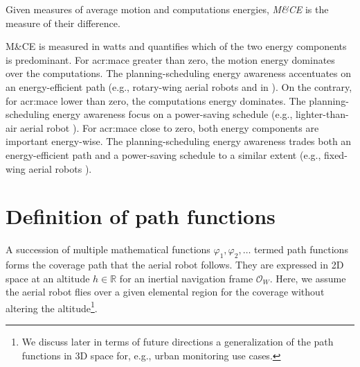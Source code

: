 \begin{defn}
  Given measures of average motion and computations energies, \textit{M\&CE} is the measure of their difference.
\end{defn}

M\&CE is measured in watts and quantifies which of the two energy components is predominant. For \Gls{acr:mace} greater than zero, the motion energy dominates over the computations. The planning-scheduling energy awareness accentuates on an energy-efficient path (e.g., rotary-wing aerial robots  and  in ). 
On the contrary, for \Gls{acr:mace} lower than zero, the computations energy dominates. The planning-scheduling energy awareness focus on a power-saving schedule (e.g., lighter-than-air aerial robot ). 
For \Gls{acr:mace} close to zero, both energy components are important energy-wise. The planning-scheduling energy awareness trades both an energy-efficient path and a power-saving schedule to a similar extent (e.g.,  fixed-wing aerial robots ). %


\section{Definition of path functions}
\label{sec:path-functions}

A succession of multiple mathematical functions $\varphi_1,\varphi_2,\dots$ termed path functions forms the coverage path that the aerial robot follows. They are expressed in 2D space at an altitude $h\in\mathbb{R}$ for an inertial navigation frame $\mathcal{O}_W$. Here, we assume the aerial robot flies over a given elemental region for the coverage without altering the altitude\footnote{We discuss later in terms of future directions a generalization of the path functions in 3D space for, e.g., urban monitoring use cases.}.

